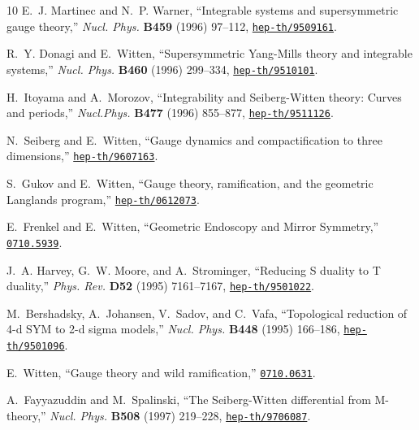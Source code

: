 \begin{thebibliography}{10}
E.~J. Martinec and N.~P. Warner, ``{Integrable systems and supersymmetric gauge
  theory},'' {\em Nucl. Phys.} {\bf B459} (1996) 97--112,
\href{http://www.arXiv.org/abs/hep-th/9509161}{{\tt hep-th/9509161}}.

R.~Y. Donagi and E.~Witten, ``Supersymmetric {Y}ang-{M}ills theory and
  integrable systems,'' {\em Nucl. Phys.} {\bf B460} (1996) 299--334,
\href{http://www.arXiv.org/abs/hep-th/9510101}{{\tt hep-th/9510101}}.

H.~Itoyama and A.~Morozov, ``{Integrability and Seiberg-Witten theory: Curves
  and periods},'' {\em Nucl.Phys.} {\bf B477} (1996) 855--877,
  \href{http://www.arXiv.org/abs/hep-th/9511126}{{\tt hep-th/9511126}}.

N.~Seiberg and E.~Witten, ``Gauge dynamics and compactification to three
  dimensions,''
\href{http://www.arXiv.org/abs/hep-th/9607163}{{\tt hep-th/9607163}}.

S.~Gukov and E.~Witten, ``{G}auge theory, ramification, and the geometric
  {L}anglands program,''
\href{http://www.arXiv.org/abs/hep-th/0612073}{{\tt hep-th/0612073}}.

E.~Frenkel and E.~Witten, ``{Geometric Endoscopy and Mirror Symmetry},''
\href{http://www.arXiv.org/abs/0710.5939}{{\tt 0710.5939}}.

J.~A. Harvey, G.~W. Moore, and A.~Strominger, ``{R}educing {S} duality to {T}
  duality,'' {\em Phys. Rev.} {\bf D52} (1995) 7161--7167,
\href{http://www.arXiv.org/abs/hep-th/9501022}{{\tt hep-th/9501022}}.

M.~Bershadsky, A.~Johansen, V.~Sadov, and C.~Vafa, ``Topological reduction of
  4-d {SYM} to 2-d sigma models,'' {\em Nucl. Phys.} {\bf B448} (1995)
  166--186,
\href{http://arXiv.org/abs/hep-th/9501096}{{\tt hep-th/9501096}}.

E.~Witten, ``Gauge theory and wild ramification,''
\href{http://www.arXiv.org/abs/0710.0631}{{\tt 0710.0631}}.

A.~Fayyazuddin and M.~Spalinski, ``{The Seiberg-Witten differential from
  M-theory},'' {\em Nucl. Phys.} {\bf B508} (1997) 219--228,
\href{http://www.arXiv.org/abs/hep-th/9706087}{{\tt hep-th/9706087}}.


\end{thebibliography}
